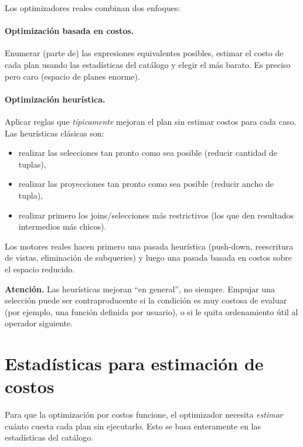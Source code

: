 \documentclass[11pt,a4paper]{article}
\begin{document}
Los optimizadores reales combinan dos enfoques:

\paragraph{Optimización basada en costos.} Enumerar (parte de) las
expresiones equivalentes posibles, estimar el costo de cada plan usando
las estadísticas del catálogo y elegir el más barato. Es preciso pero caro
(espacio de planes enorme).

\paragraph{Optimización heurística.} Aplicar reglas que \emph{típicamente}
mejoran el plan sin estimar costos para cada caso. Las heurísticas
clásicas son:

\begin{itemize}
    \item realizar las selecciones tan pronto como sea posible (reducir
    cantidad de tuplas),
    \item realizar las proyecciones tan pronto como sea posible (reducir
    ancho de tupla),
    \item realizar primero los joins/selecciones más restrictivos (los que
    den resultados intermedios más chicos).
\end{itemize}

Los motores reales hacen primero una pasada heurística (push-down,
reescritura de vistas, eliminación de subqueries) y luego una pasada
basada en costos sobre el espacio reducido.

\begin{nota}
\textbf{Atención.} Las heurísticas mejoran ``en general'', no siempre.
Empujar una selección puede ser contraproducente si la condición es muy
costosa de evaluar (por ejemplo, una función definida por usuario), o si
le quita ordenamiento útil al operador siguiente.
\end{nota}

\section{Estadísticas para estimación de costos}

Para que la optimización por costos funcione, el optimizador necesita
\emph{estimar} cuánto cuesta cada plan sin ejecutarlo. Esto se basa
enteramente en las estadísticas del catálogo.
\end{document}
